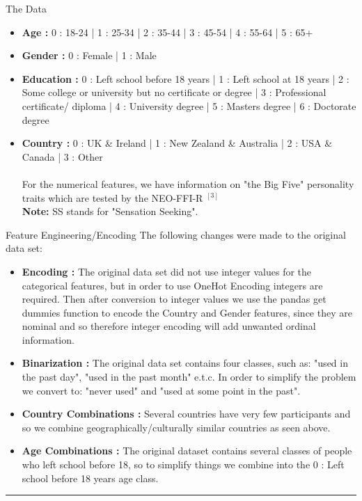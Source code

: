 \documentclass[6pt, final, xcolor=table]{beamer}
\newlength{\colwidth}
\begin{document}
\begin{frame}[t]
\begin{columns}[t]
\begin{column}{\colwidth}
\begin{block}{The Data}
    \begin{itemize}
 \item \textbf{Age : } 0 : 18-24 | 1 : 25-34 | 2 : 35-44 | 3 : 45-54 | 4 : 55-64 | 5 : 65+
 \item \textbf{Gender : } 0 : Female | 1 : Male
 \item \textbf{Education : } 0 : Left school before 18 years |  1 : Left school at 18 years | 
 2 : Some college or university but no certificate or degree | 3 : Professional certificate/ diploma | 4 : University degree | 5 : Masters degree | 6 : Doctorate degree
 \item \textbf{Country : } 0 : UK \& Ireland | 1 : New Zealand \& Australia | 2 : USA \& Canada | 3 : Other \\
 ~ ~ \\
 For the numerical features, we have information on "the Big Five" personality traits which
 are tested by the NEO-FFI-R $^{[3]}$ \\
 \textbf{Note:} SS stands for "Sensation Seeking".
 \end{itemize}
 

  \end{block}

  \begin{block}{Feature Engineering/Encoding}
    The following changes were made to the original data set:
 \begin{itemize}
     \item \textbf{Encoding :} The original data set did not use integer values for the categorical
 features, but in order to use OneHot Encoding integers are required.
 Then after conversion to integer values we use the pandas get dummies function to 
 encode the Country and Gender features, since they are nominal and so therefore integer encoding
 will add unwanted ordinal information.
  \item \textbf{Binarization :} The original data set contains four classes, such as: "used in the past day", "used in the past month" e.t.c. In order to simplify the problem
 we convert to: "never used" and "used at some point in the past".
  \item \textbf{Country Combinations :} Several countries have very few participants and so
  we combine geographically/culturally similar countries as seen above.
  \item \textbf{Age Combinations :} The original dataset contains several classes of people who left school before 18,
  so to simplify things we combine into the 0 : Left school before 18 years age class.
 \end{itemize}
\hrule
\vspace{2mm}


\end{block}
\end{column}
\end{columns}
\end{frame}
\end{document}
